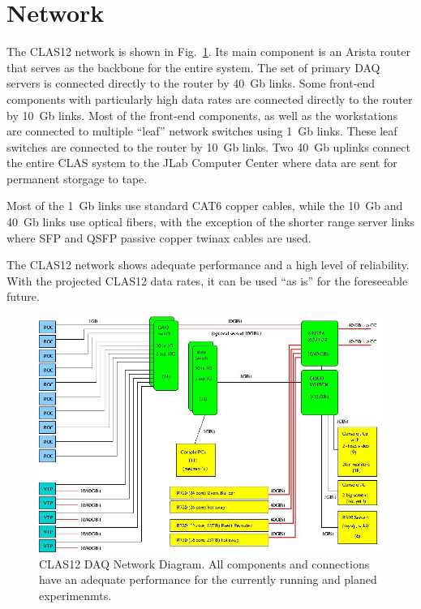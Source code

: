\section{Network}

The CLAS12 network is shown in Fig.~\ref{fig:network_diagram}. Its main component is an Arista router that serves as the backbone for the entire system. The set of primary DAQ servers is connected directly to the router by 40~Gb links. Some front-end components with particularly high data rates are connected directly to the router by 10~Gb links. Most of the front-end components, as well as the workstations are connected to multiple ``leaf'' network switches using 1~Gb links. These leaf switches are connected to the router by 10~Gb links. Two 40~Gb uplinks connect the entire CLAS system to the JLab Computer Center where data are sent for permanent storgage to tape.

Most of the 1~Gb links use standard CAT6 copper cables, while the 10~Gb and 40~Gb links use optical fibers, with the exception of the shorter range server links where SFP and QSFP passive copper twinax cables are used.

The CLAS12 network shows adequate performance and a high level of reliability. With the projected CLAS12 data rates, it can be used ``as is'' for the foreseeable future.

\begin{figure}[hbt]
	\centering
	\includegraphics[width=1.0\columnwidth,keepaspectratio]{img/CLAS12_NET_1.jpg}
	\caption{CLAS12 DAQ Network Diagram. All components and connections have an adequate performance for the currently running and planed experimenmts.}
	\label{fig:network_diagram}
\end{figure}
